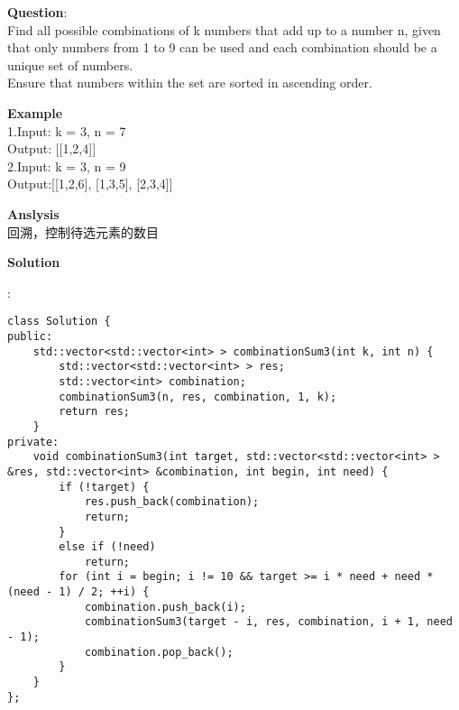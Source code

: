 \begin{description}
    \item{\textbf{Question}}:\\%
		Find all possible combinations of k numbers that add up to a number n, given that only numbers from 1 to 9 can be used and each combination should be a unique set of numbers.\\
		Ensure that numbers within the set are sorted in ascending order.\\

    \item{\textbf{Example}}\\
		1.Input: k = 3, n = 7\\
		Output: [[1,2,4]]\\
		
		2.Input: k = 3, n = 9\\
		Output:[[1,2,6], [1,3,5], [2,3,4]]\\

    \item{\textbf{Anslysis}}\\
		回溯，控制待选元素的数目\\

    \item{\textbf{Solution}}\\
	\item{} : \\
		\begin{lstlisting}
class Solution {
public:
    std::vector<std::vector<int> > combinationSum3(int k, int n) {
        std::vector<std::vector<int> > res;
        std::vector<int> combination;
        combinationSum3(n, res, combination, 1, k);
        return res;
    }
private:
    void combinationSum3(int target, std::vector<std::vector<int> > &res, std::vector<int> &combination, int begin, int need) {
        if (!target) {
            res.push_back(combination);
            return;
        }
        else if (!need)
            return;
        for (int i = begin; i != 10 && target >= i * need + need * (need - 1) / 2; ++i) {
            combination.push_back(i);
            combinationSum3(target - i, res, combination, i + 1, need - 1);
            combination.pop_back();
        }
    }
};
		\end{lstlisting}
\end{description}
